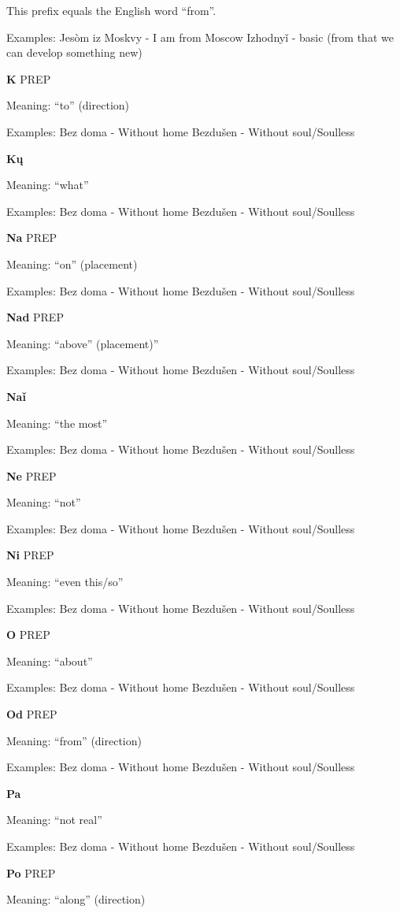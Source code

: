 This prefix equals the English word “from”. 

Examples:
Jesòm iz Moskvy - I am from Moscow
Izhodnyǐ - basic (from that we can develop something new)

\textbf{K} PREP

Meaning: “to” (direction)

Examples:
Bez doma - Without home
Bezdušen - Without soul/Soulless 

\textbf{Kų}

Meaning: “what”

Examples:
Bez doma - Without home
Bezdušen - Without soul/Soulless 

\textbf{Na} PREP

Meaning: “on” (placement)

Examples:
Bez doma - Without home
Bezdušen - Without soul/Soulless 

\textbf{Nad} PREP

Meaning: “above” (placement)”

Examples:
Bez doma - Without home
Bezdušen - Without soul/Soulless 

\textbf{Naǐ}

Meaning: “the most”

Examples:
Bez doma - Without home
Bezdušen - Without soul/Soulless 


\textbf{Ne} PREP

Meaning: “not”

Examples:
Bez doma - Without home
Bezdušen - Without soul/Soulless 

\textbf{Ni} PREP

Meaning: “even this/so”

Examples:
Bez doma - Without home
Bezdušen - Without soul/Soulless 

\textbf{O}  PREP

Meaning: “about”

Examples:
Bez doma - Without home
Bezdušen - Without soul/Soulless 

\textbf{Od} PREP

Meaning: “from” (direction)

Examples:
Bez doma - Without home
Bezdušen - Without soul/Soulless 

\textbf{Pa}

Meaning: “not real”

Examples:
Bez doma - Without home
Bezdušen - Without soul/Soulless 


\textbf{Po} PREP

Meaning: “along” (direction)

